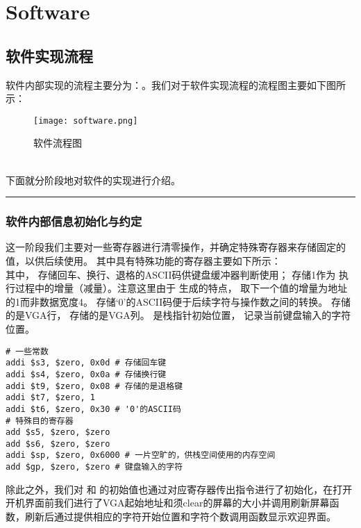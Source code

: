 \chapter{Software}
\section{软件实现流程}
\kaishu
\hspace*{5mm}软件内部实现的流程主要分为：。我们对于软件实现流程的流程图主要如下图所示：
\begin{figure}[htbp]
    \centering
    \caption{软件流程图}
    \texttt{[image: software.png]}
\end{figure}
\songti
\\下面就分阶段地对软件的实现进行介绍。

\rule[-10pt]{14.3cm}{0.05em}
\subsection{软件内部信息初始化与约定}
\hspace*{5mm}这一阶段我们主要对一些寄存器进行清零操作，并确定特殊寄存器来存储固定的值，以供后续使用。
其中具有特殊功能的寄存器主要如下所示：
\kaishu
\\\hspace*{5mm}其中， 存储回车、换行、退格的ASCII码供键盘缓冲器判断使用； 存储1作为  执行过程中的增量（减量）。注意这里由于  生成的特点， 取下一个值的增量为地址的1而非数据宽度4。  存储`0'的ASCII码便于后续字符与操作数之间的转换。 存储的是VGA行， 存储的是VGA列。 是栈指针初始位置， 记录当前键盘输入的字符位置。
\begin{lstlisting}[style=assembler-style, caption={State Initialization}]
# 一些常数
addi $s3, $zero, 0x0d # 存储回车键
addi $s4, $zero, 0x0a # 存储换行键
addi $t9, $zero, 0x08 # 存储的是退格键
addi $t7, $zero, 1
addi $t6, $zero, 0x30 # '0'的ASCII码
# 特殊目的寄存器
add $s5, $zero, $zero
add $s6, $zero, $zero
addi $sp, $zero, 0x6000 # 一片空旷的，供栈空间使用的内存空间
add $gp, $zero, $zero # 键盘输入的字符
\end{lstlisting}
\hspace*{5mm}除此之外，我们对 和 的初始值也通过对应寄存器传出指令进行了初始化，在打开开机界面前我们进行了VGA起始地址和须clear的屏幕的大小并调用刷新屏幕函数，刷新后通过提供相应的字符开始位置和字符个数调用函数显示欢迎界面。
